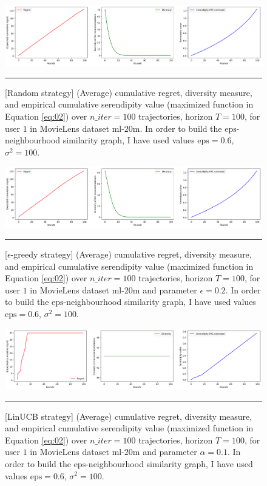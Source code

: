 \documentclass{article}
\begin{document}
\begin{figure}[H]
  \centering
  \rule[-.5cm]{0cm}{4cm}
  \includegraphics[scale=0.4]{../Results/ml-20m/random-48sec.png}
  \rule[-.5cm]{4cm}{0cm}
  \caption{[Random strategy] (Average) cumulative regret, diversity measure, and empirical cumulative serendipity value (maximized function in Equation \ref{eq:02}) over $n\_iter=100$ trajectories, horizon $T=100$, for user $1$ in MovieLens dataset $\text{ml-20m}$. In order to build the $\text{eps}$-neighbourhood similarity graph, I have used values $\text{eps}=0.6$, $\sigma^{2}=100$.}
\label{figrandom}
\end{figure}

\begin{figure}[H]
  \centering
  \rule[-.5cm]{0cm}{4cm}
  \includegraphics[scale=0.4]{../Results/ml-20m/greedy-2min16sec.png}
  \rule[-.5cm]{4cm}{0cm}
  \caption{[$\epsilon$-greedy strategy] (Average) cumulative regret, diversity measure, and empirical cumulative serendipity value (maximized function in Equation \ref{eq:02}) over $n\_iter=100$ trajectories, horizon $T=100$, for user $1$ in MovieLens dataset $\text{ml-20m}$ and parameter $\epsilon=0.2$. In order to build the $\text{eps}$-neighbourhood similarity graph, I have used values $\text{eps}=0.6$, $\sigma^{2}=100$.}
\label{figgreedy}
\end{figure}

\begin{figure}[H]
  \centering
  \rule[-.5cm]{0cm}{4cm}
  \includegraphics[scale=0.4]{../Results/ml-20m/linUCB-53sec.png}
  \rule[-.5cm]{4cm}{0cm}
  \caption{[LinUCB strategy] (Average) cumulative regret, diversity measure, and empirical cumulative serendipity value (maximized function in Equation \ref{eq:02}) over $n\_iter=100$ trajectories, horizon $T=100$, for user $1$ in MovieLens dataset $\text{ml-20m}$ and parameter $\alpha=0.1$. In order to build the $\text{eps}$-neighbourhood similarity graph, I have used values $\text{eps}=0.6$, $\sigma^{2}=100$.}
\label{figlinUCB}
\end{figure}
\end{document}
